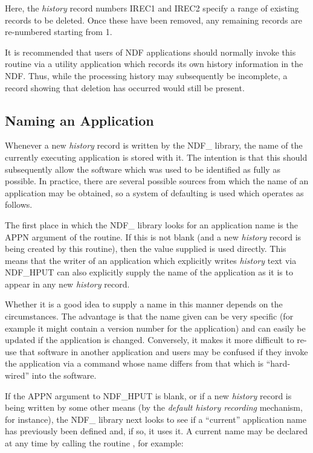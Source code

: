 \documentclass[twoside,11pt,nolof]{starlink}
\providecommand{\st}[1]{{\emph{#1}}}
\begin{document}
Here, the \st{history\/} record numbers IREC1 and IREC2 specify a range of
existing records to be deleted. Once these have been removed, any
remaining records are re-numbered starting from 1.

It is recommended that users of NDF applications should normally
invoke this routine via a utility application which records its own
history information in the NDF. Thus, while the processing history may
subsequently be incomplete, a record showing that deletion has
occurred would still be present.

\subsection{\label{ss:naminghistoryapp}Naming an Application}

Whenever a new \st{history\/} record is written by the NDF\_ library, the
name of the currently executing application is stored with it. The
intention is that this should subsequently allow the software which
was used to be identified as fully as possible. In practice, there are
several possible sources from which the name of an application may be
obtained, so a system of defaulting is used which operates as follows.

The first place in which the NDF\_ library looks for an application
name is the APPN argument of the  routine. If this is not
blank (and a new \st{history\/} record is being created by this routine),
then the value supplied is used directly. This means that the writer
of an application which explicitly writes \st{history\/} text via NDF\_HPUT
can also explicitly supply the name of the application as it is to
appear in any new \st{history\/} record.

Whether it is a good idea to supply a name in this manner depends on
the circumstances. The advantage is that the name given can be very
specific (for example it might contain a version number for the
application) and can easily be updated if the application is changed.
Conversely, it makes it more difficult to re-use that software in
another application and users may be confused if they invoke the
application via a command whose name differs from that which is
``hard-wired'' into the software.

If the APPN argument to NDF\_HPUT is blank, or if a new \st{history\/} record
is being written by some other means (by the \st{default history recording\/}
mechanism, for instance), the NDF\_ library next looks to see if a
``current'' application name has previously been defined and, if so, it
uses it. A current name may be declared at any time by calling the
routine , for example:
\end{document}
